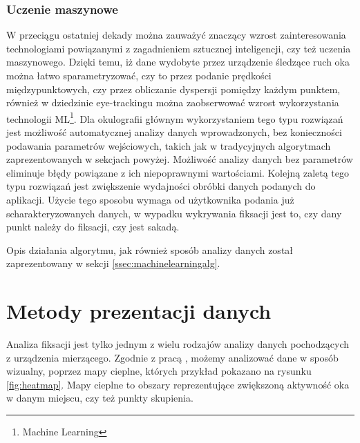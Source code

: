 \subsubsection{Uczenie maszynowe}
\label{ssec:machinelearning}
W przeciągu ostatniej dekady można zauważyć znaczący wzrost zainteresowania technologiami powiązanymi z zagadnieniem sztucznej inteligencji, czy też uczenia maszynowego. Dzięki temu, iż dane wydobyte przez urządzenie śledzące ruch oka można łatwo sparametryzować, czy to przez podanie prędkości międzypunktowych, czy przez obliczanie dyspersji pomiędzy każdym punktem, również w dziedzinie eye-trackingu można zaobserwować wzrost wykorzystania technologii ML\footnote{Machine Learning}. Dla okulografii głównym wykorzystaniem tego typu rozwiązań jest możliwość automatycznej analizy danych wprowadzonych, bez konieczności podawania parametrów wejściowych, takich jak w tradycyjnych algorytmach zaprezentowanych w sekcjach powyżej. Możliwość analizy danych bez parametrów eliminuje błędy powiązane z ich niepoprawnymi wartościami. Kolejną zaletą tego typu rozwiązań jest zwiększenie wydajności obróbki danych podanych do aplikacji. Użycie tego sposobu wymaga od użytkownika podania już scharakteryzowanych danych, w wypadku wykrywania fiksacji jest to, czy dany punkt należy do fiksacji, czy jest sakadą.\par
Opis działania algorytmu, jak również sposób analizy danych został zaprezentowany w sekcji \ref{ssec:machinelearningalg}.
\section{Metody prezentacji danych}
\label{sec:othereyetracking}
Analiza fiksacji jest tylko jednym z wielu rodzajów analizy danych pochodzących z urządzenia mierzącego. Zgodnie z pracą \cite[rozdział 2.2]{OtherEyetrack}, możemy analizować dane w sposób wizualny, poprzez mapy cieplne, których przykład pokazano na rysunku \ref{fig:heatmap}. Mapy cieplne to obszary reprezentujące zwiększoną aktywność oka w danym miejscu, czy też punkty skupienia.

